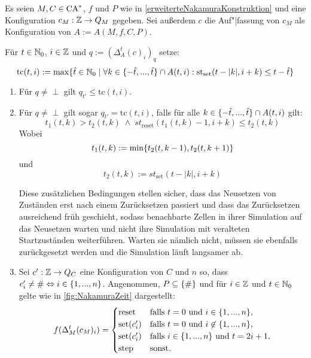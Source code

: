 \begin{satz}
    \label{timeNakamuraConstruction}
    Es seien $M, C \in \textrm{CA}^*$, $f$ und $P$ wie in \cref{erweiterteNakamuraKonstruktion} und eine Konfiguration $c_M: \mathbb{Z} \to Q_M$ gegeben.
    Sei außerdem $c$ die Auf"|fassung von $c_M$ als Konfiguration von $A := A(M, f, C, P)$.
    
    Für $t \in \mathbb{N}_0$, $i \in \mathbb{Z}$ und $q := (\Delta_{A}^t(c)_i)_q$ setze:
    \[
        \mathrm{tc}(t, i) := \max \{ { \hat{t} \in \mathbb{N}_0} \; | \; {
                \forall k \in \{ {-\hat{t}, ..., \hat{t} } \} \cap A(t, i):
                \mathrm{st}_{\mathrm{set}}(t-|k|, i+k) \leq t - \hat{t}
            } \}
    \]
    \begin{enumerate}
        \item \label{timeNakamuraConstruction_1}
            Für $q \neq \perp$ gilt $q_{t'} \leq \mathrm{tc}(t, i)$.
        \item \label{timeNakamuraConstruction_2}
            Für $q \neq \perp$ gilt sogar  $q_{t'} = \mathrm{tc}(t, i)$, falls für alle $k \in \{ {-\hat{t}, ..., \hat{t} } \} \cap A(t, i)$ gilt:
            \[
                t_1(t, k) > t_2(t, k)
                \; \land \;
                st_{\mathrm{reset}}(t_1(t, k) - 1, i + k) \leq t_2(t, k)
            \]
            Wobei
            \[
                t_1(t, k) := \min \{ { t_2(t, k - 1), t_2(t, k + 1) } \}
            \]
            und
            \[
                t_2(t, k) := st_{\mathrm{set}}(t - |k|, i + k)
            \]
            
            Diese zusätzlichen Bedingungen stellen sicher,
            dass das Neusetzen von Zuständen erst nach einem Zurücksetzen passiert
            und dass das Zurücksetzen ausreichend früh geschieht, sodass benachbarte Zellen
            in ihrer Simulation auf das Neusetzen warten und nicht ihre Simulation mit veralteten Startzuständen weiterführen.
            Warten sie nämlich nicht, müssen sie ebenfalls zurückgesetzt werden und die Simulation läuft langsamer ab.
            
            
        \item \label{timeNakamuraConstruction_3}
            Sei $c': \mathbb{Z} \to Q_C$ eine Konfiguration von $C$ und $n$ so, dass $c'_i \neq \# \Leftrightarrow i \in \{ { 1, ..., n } \}$.
            Angenommen, $P \subseteq \{ { \# } \} $ und für $i \in \mathbb{Z}$ und $t \in \mathbb{N}_0$ gelte wie in \cref{fig:NakamuraZeit} dargestellt:
            \[
                f(\Delta_M^t(c_M)_i) =
                \begin{cases}
                    \mathrm{reset} & \text{falls } t = 0 \text{ und } i \in \{ {1, ..., n} \}, \\
                    \mathrm{set}(c'_i) & \text{falls } t = 0 \text{ und } i \not\in \{ {1, ..., n} \}, \\
                    \mathrm{set}(c'_i) & \text{falls } i \in \{ {1, ..., n} \} \text{ und } t = 2i + 1, \\
                    \mathrm{step} & \text{sonst.}
                \end{cases}
            \]
            

\end{enumerate}
\end{satz}
